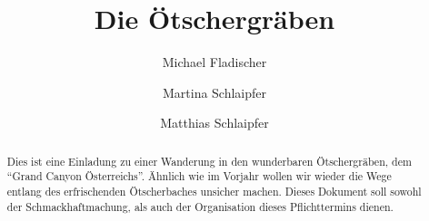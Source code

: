 \documentclass[twoside]{article}
\title{\vspace{-15mm}\fontsize{24pt}{10pt}\selectfont\textbf{Die Ötschergräben}} %
\author{%
Michael Fladischer
\and
Martina Schlaipfer
\and
Matthias Schlaipfer
\vspace{-5mm}
}
\date{}
\begin{document}
\maketitle %

\thispagestyle{fancy} %


\begin{abstract}

\noindent Dies ist eine Einladung zu einer Wanderung in den wunderbaren
Ötschergräben, dem ``Grand Canyon Österreichs''. Ähnlich wie im Vorjahr wollen
wir wieder die Wege entlang des erfrischenden Ötscherbaches unsicher machen.
Dieses Dokument soll sowohl der Schmackhaftmachung, als auch der Organisation
dieses Pflichttermins dienen.

\end{abstract}

\end{document}
